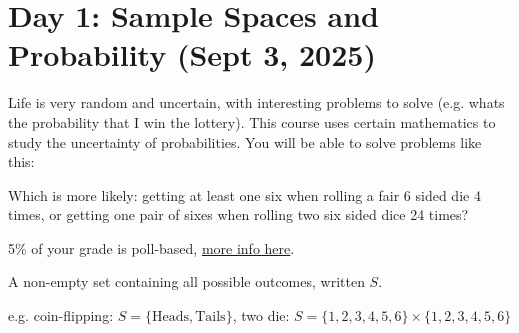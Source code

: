 \section{Day 1: Sample Spaces and Probability (Sept 3, 2025)}

Life is very random and uncertain, with interesting problems to solve (e.g. whats the probability that I win the lottery). This course uses certain mathematics to study the uncertainty of probabilities. You will be able to solve problems like this:

\begin{problem}
Which is more likely: getting at least one six when rolling a fair 6 sided die 4 times, or getting one pair of sixes when rolling two six sided dice 24 times?
\end{problem}

5\% of your grade is poll-based, \href{http://probability.ca/jeff/teaching/2526/sta257/pollinfo.html}{more info here}.

\begin{definition}
A non-empty set containing all possible outcomes, written $S$.
\end{definition}

e.g. coin-flipping: $S = \{ \text{Heads}, \text{Tails} \}$, two die: $S = \{ 1, 2, 3, 4, 5, 6 \} \times \{ 1, 2, 3, 4 ,5 , 6 \}$


